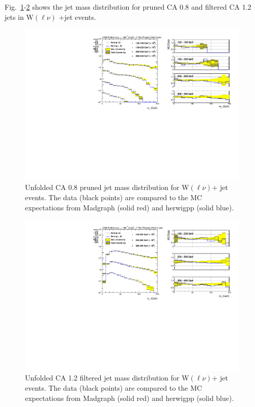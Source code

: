 Fig.~\ref{figs:prunedWmnInt1}-\ref{figs:prunedWmnInt2} shows the jet mass distribution for pruned CA 0.8 and filtered CA 1.2 jets in W$(\ell\nu)$ +jet events.

\begin{figure}[!htb]
\centering
\includegraphics[width=0.99\textwidth]{figs/Wln/jetmassunf_ca8pr_log.pdf}
\caption{Unfolded CA 0.8 pruned jet mass distribution for W$(\ell\nu)$+ jet events. The data (black points) are compared to the MC expectations from Madgraph (solid red) and herwigpp (solid blue).}
\label{figs:prunedWmnInt1}
\end{figure}

\begin{figure}[!htb]
\centering
\includegraphics[width=0.99\textwidth]{figs/Wln/jetmassunf_ca12ft_log.pdf}
\caption{Unfolded CA 1.2 filtered jet mass distribution for W$(\ell\nu)$+ jet events. The data (black points) are compared to the MC expectations from Madgraph (solid red) and herwigpp (solid blue).}
\label{figs:prunedWmnInt2}
\end{figure}

\clearpage






